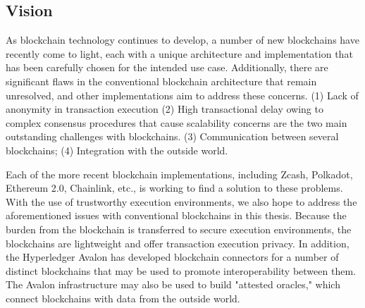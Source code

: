 \subsection{Vision}
As blockchain technology continues to develop, a number of new blockchains have recently come to light, each with a unique architecture and implementation that has been carefully chosen for the intended use case. Additionally, there are significant flaws in the conventional blockchain architecture that remain unresolved, and other implementations aim to address these concerns. (1) Lack of anonymity in transaction execution (2) High transactional delay owing to complex consensus procedures that cause scalability concerns are the two main outstanding challenges with blockchains. (3) Communication between several blockchains; (4) Integration with the outside world.

\vspace{.5cm}

Each of the more recent blockchain implementations, including Zcash, Polkadot, Ethereum 2.0, Chainlink, etc., is working to find a solution to these problems. With the use of trustworthy execution environments, we also hope to address the aforementioned issues with conventional blockchains in this thesis. Because the burden from the blockchain is transferred to secure execution environments, the blockchains are lightweight and offer transaction execution privacy. In addition, the Hyperledger Avalon has developed blockchain connectors for a number of distinct blockchains that may be used to promote interoperability between them. The Avalon infrastructure may also be used to build "attested oracles," which connect blockchains with data from the outside world.
